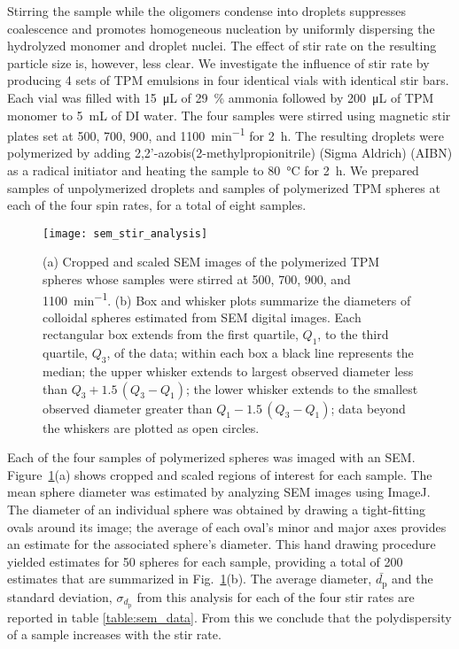 Stirring the sample while the oligomers condense into droplets suppresses coalescence and
promotes homogeneous nucleation by uniformly dispersing the hydrolyzed monomer and droplet
nuclei. %
The effect of stir rate on the resulting particle size is, however, less clear.
We investigate the influence of stir rate by producing \num{4} sets of TPM emulsions
in four identical vials with identical stir bars. Each vial was filled with
\SI{15}{\micro\liter} of \SI{29}{\percent} ammonia followed by
\SI{200}{\micro\liter} of TPM monomer to \SI{5}{\milli\liter} of DI water.
The four samples were stirred 
using magnetic stir plates set at \num{500}, \num{700}, \num{900}, and
\SI{1100}{\minute^{-1}} for \SI{2}{\hour}. 
The resulting droplets were polymerized by adding
\num{2},\num{2}'-azobis(\num{2}-methylpropionitrile) (Sigma Aldrich) (AIBN)
as a radical initiator and %
heating the sample to \SI{80}{\celsius} for \SI{2}{\hour}.
We prepared samples of unpolymerized droplets and samples of polymerized TPM spheres
at each of the four spin rates, for a total of eight samples.

\begin{figure}
    \centering
    \texttt{[image: sem\_stir\_analysis]}
    \caption{(a) Cropped and scaled SEM images of the polymerized TPM spheres whose
      samples were stirred at \num{500}, \num{700}, \num{900}, and \SI{1100}{\minute^{-1}}.
      (b)  Box and whisker plots summarize the diameters of colloidal spheres estimated from
      SEM digital images. Each rectangular box extends from the first quartile, $Q_1$, to
      the third quartile, $Q_3$, of the data; within each box a black line represents the median;
      the upper whisker extends to largest observed diameter less than $Q_3 + 1.5\, (Q_3 - Q_1)$;
      the lower whisker extends to the smallest observed diameter greater than $Q_1 - 1.5\, (Q_3 - Q_1)$;
      data beyond the whiskers are plotted as open circles. }
    \label{fig:sem_stir_rate}
\end{figure}

Each of the four samples of polymerized spheres was imaged with an SEM.
Figure~\ref{fig:sem_stir_rate}(a) shows cropped and scaled regions of interest
for each sample. The mean sphere diameter was estimated by analyzing SEM images using
ImageJ. The diameter of an individual sphere was obtained by
drawing a tight-fitting ovals around its image;
the average of each oval's minor and major axes provides an estimate for the
associated sphere's diameter. This hand drawing procedure yielded estimates
for \num{50} spheres for each sample, providing a total of \num{200} estimates
that are summarized in Fig.~\ref{fig:sem_stir_rate}(b). The average 
diameter, $\bar{d_{\text{p}}}$ and the standard deviation, $\sigma_{d_{\text{p}}}$
from this analysis for each of the four stir rates are reported
in table \ref{table:sem_data}. From this we conclude that the polydispersity of a
sample increases with the stir rate.


